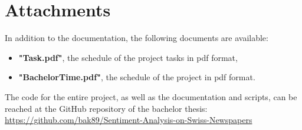 \section{Attachments}
In addition to the documentation, the following documents are available:
\begin{itemize}
    \item \textbf{"Task.pdf"}, the schedule of the project tasks in pdf format,
    \item \textbf{"BachelorTime.pdf"}, the schedule of the project in pdf format.
\end{itemize}

The code for the entire project, as well as the documentation and scripts, can be reached at the \gls{GitHub} repository of the bachelor thesis:\\
\url{https://github.com/bak89/Sentiment-Analysis-on-Swiss-Newspapers}
